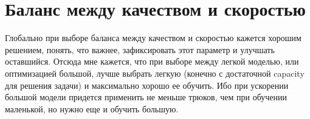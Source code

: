 \documentclass[13pt,a4paper]{article}
\theoremstyle{remark}
\begin{document}
	\section{Баланс между качеством и скоростью}
	
	 
	 
	 Глобально при выборе баланса между качеством и скоростью кажется хорошим решением, понять, что важнее, зафиксировать этот параметр и улучшать оставшийся. Отсюда мне кажется, что при выборе между легкой моделью, или оптимизацией большой, лучше выбрать легкую (конечно с достаточной capacity для решения задачи) и максимально хорошо ее обучить. Ибо при ускорении большой модели придется применить не меньше трюков, чем при обучении маленькой, но нужно еще и обучить большую.
	
	
	
%	
%		
%		
%		
%		
%		
%		
			
		
\end{document}
